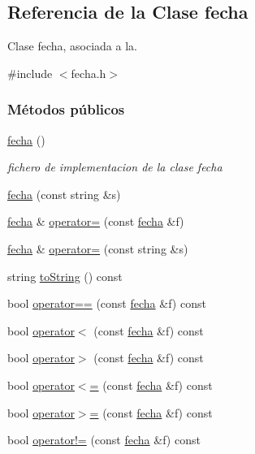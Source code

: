 \hypertarget{classfecha}{}\subsection{Referencia de la Clase fecha}
\label{classfecha}


Clase fecha, asociada a la.  




{\ttfamily \#include $<$fecha.\+h$>$}

\subsubsection*{Métodos públicos}
\begin{DoxyCompactItemize}
\item 
\hyperlink{classfecha_a6775ef84b5838e12e28fd341793f4539}{fecha} ()
\begin{DoxyCompactList}\small\item\em fichero de implementacion de la clase fecha \end{DoxyCompactList}\item 
\hyperlink{classfecha_aed5c22d5eeb15f1f2927d5a2c28b74df}{fecha} (const string \&s)
\item 
\hyperlink{classfecha}{fecha} \& \hyperlink{classfecha_ac7f5398b71cbccc4cd74f8c5e56b80ce}{operator=} (const \hyperlink{classfecha}{fecha} \&f)
\item 
\hyperlink{classfecha}{fecha} \& \hyperlink{classfecha_adf0cb1494d557581d89e3289ab121bc5}{operator=} (const string \&s)
\item 
string \hyperlink{classfecha_a26d22b980284408eac0da084f358c43b}{to\+String} () const 
\item 
bool \hyperlink{classfecha_ac971e131a6e3edf57c2313468524f364}{operator==} (const \hyperlink{classfecha}{fecha} \&f) const 
\item 
bool \hyperlink{classfecha_a27803300b9698e1a40ef48f2009948c5}{operator$<$} (const \hyperlink{classfecha}{fecha} \&f) const 
\item 
bool \hyperlink{classfecha_aaded7646e80d88492b31b17b4fb001fd}{operator$>$} (const \hyperlink{classfecha}{fecha} \&f) const 
\item 
bool \hyperlink{classfecha_a8dfb2f2a7424bdb1dacc6df122b0a0c8}{operator$<$=} (const \hyperlink{classfecha}{fecha} \&f) const 
\item 
bool \hyperlink{classfecha_a98d0f3009cb7205b5ddb3b81596d9cc7}{operator$>$=} (const \hyperlink{classfecha}{fecha} \&f) const 
\item 
bool \hyperlink{classfecha_a1f6d28759c45b138efb80d25a7c398b8}{operator!=} (const \hyperlink{classfecha}{fecha} \&f) const 
\end{DoxyCompactItemize}
